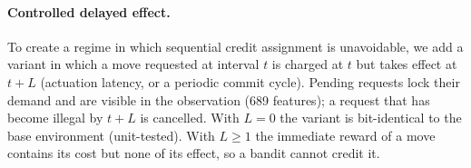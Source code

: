 \paragraph{Controlled delayed effect.}
To create a regime in which sequential credit assignment is unavoidable, we
add a variant in which a move requested at interval $t$ is charged at $t$ but
takes effect at $t+L$ (actuation latency, or a periodic commit cycle). Pending
requests lock their demand and are visible in the observation (689 features);
a request that has become illegal by $t+L$ is cancelled. With $L=0$ the
variant is bit-identical to the base environment (unit-tested). With $L\ge1$
the immediate reward of a move contains its cost but none of its effect, so a
bandit cannot credit it.
